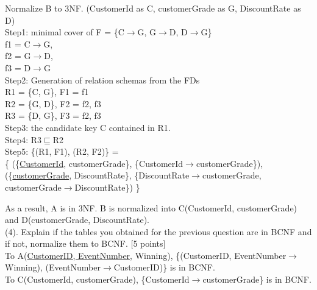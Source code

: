 \documentclass[]{article}
\begin{document}
	\noindent Normalize B to 3NF. (CustomerId as C, customerGrade as G, DiscountRate as D) \\
	
	\noindent Step1: minimal cover of F = \{C$\rightarrow$G, G$\rightarrow$D, D$\rightarrow$G\}  \\
	
	f1 = C$\rightarrow$G,\\
	
	f2 = G$\rightarrow$D,\\
	
	f3 = D$\rightarrow$G \\
	
	\noindent Step2: Generation of relation schemas from the FDs  \\
	
	R1 = \{C, G\}, F1 = f1 \\
	
	R2 = \{G, D\}, F2 = f2, f3 \\
	
	R3 = \{D, G\}, F3 = f2, f3 \\
	
	\noindent Step3: the candidate key C contained in R1.  \\
	
	\noindent Step4: R3$\sqsubseteq$R2  \\
	
	\noindent Step5: \{(R1, F1), (R2, F2)\} = \\
	
	\{
		(\{\underline{CustomerId}, customerGrade\}, \{CustomerId$\rightarrow$customerGrade\}), 
		(\{\underline{customerGrade}, DiscountRate\}, \{DiscountRate$\rightarrow$customerGrade, customerGrade$\rightarrow$DiscountRate\})
	\}
	
	\noindent As a result, A is in 3NF. B is normalized into C(CustomerId, customerGrade) and D(customerGrade, DiscountRate). \\
	
	\noindent (4). Explain if the tables you obtained for the previous question are in BCNF and if not, normalize them to BCNF. [5 points] \\
	
	\noindent To A(\underline{CustomerID, EventNumber}, Winning), \{(CustomerID, EventNumber$\rightarrow$Winning), (EventNumber$\rightarrow$CustomerID)\} is in BCNF.  \\
	
	\noindent To C(CustomerId, customerGrade), \{CustomerId$\rightarrow$customerGrade\} is in BCNF. \\
	
\end{document}
